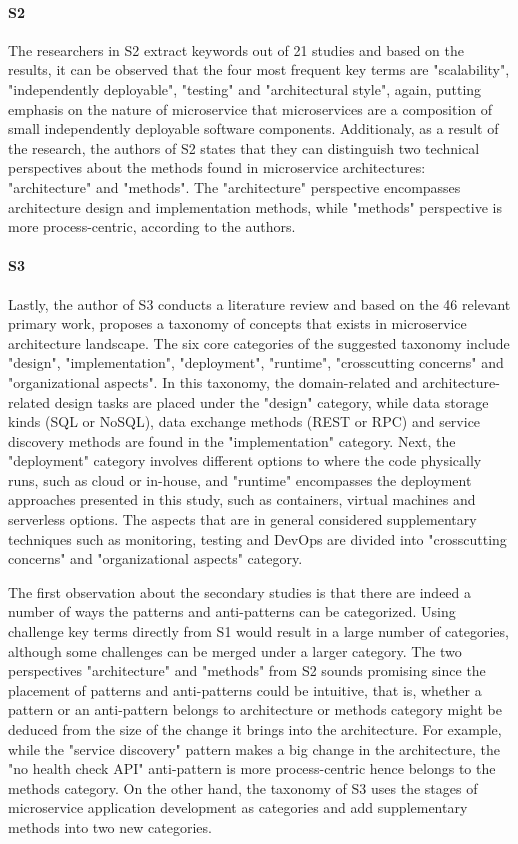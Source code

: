 \documentclass{Configuration_Files/PoliMi3i_thesis}
\begin{document}
\paragraph{S2} The researchers in S2 extract keywords out of 21 studies and based on the results, it can be observed that the four most frequent key terms are "scalability", "independently deployable", "testing" and "architectural style", again, putting emphasis on the nature of microservice that microservices are a composition of small independently deployable software components.
Additionaly, as a result of the research, the authors of S2 states that they can distinguish two technical perspectives about the methods found in microservice architectures: "architecture" and "methods".
The "architecture" perspective encompasses architecture design and implementation methods, while "methods" perspective is more process-centric, according to the authors.

\paragraph{S3} Lastly, the author of S3 conducts a literature review and based on the 46 relevant primary work, proposes a taxonomy of concepts that exists in microservice architecture landscape.
The six core categories of the suggested taxonomy include "design", "implementation", "deployment", "runtime", "crosscutting concerns" and "organizational aspects".
In this taxonomy, the domain-related and architecture-related design tasks are placed under the "design" category, while data storage kinds (SQL or NoSQL), data exchange methods (REST or RPC) and service discovery methods are found  in the "implementation" category.
Next, the "deployment" category involves different options to where the code physically runs, such as cloud or in-house, and "runtime" encompasses the deployment approaches presented in this study, such as containers, virtual machines and serverless options.
The aspects that are in general considered supplementary techniques such as monitoring, testing and DevOps are divided into "crosscutting concerns" and "organizational aspects" category.

The first observation about the secondary studies is that there are indeed a number of ways the patterns and anti-patterns can be categorized.
Using challenge key terms directly from S1 would result in a large number of categories, although some challenges can be merged under a larger category.
The two perspectives "architecture" and "methods" from S2 sounds promising since the placement of patterns and anti-patterns could be intuitive, that is, whether a pattern or an anti-pattern belongs to architecture or methods category might be deduced from the size of the change it brings into the architecture.
For example, while the "service discovery" pattern makes a big change in the architecture, the "no health check API" anti-pattern is more process-centric hence belongs to the methods category.
On the other hand, the taxonomy of S3 uses the stages of microservice application development as categories and add supplementary methods into two new categories.
\end{document}
